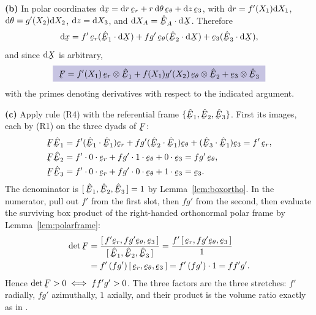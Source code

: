 \begin{solution}
\textbf{(b)} In polar coordinates $\dl\bx=\dl r\,\ber+r\,\dl\theta\,\bet
+\dl z\,\be_{3}$, with $\mathrm{d} r=f'(X_{1})\mathrm{d} X_{1}$,
$\mathrm{d}\theta=g'(X_{2})\mathrm{d} X_{2}$, $\mathrm{d} z=\mathrm{d} X_{3}$, and
$\dl X_{A}=\ip{\hbE_{A}}{\dl\bX}$. Therefore
\[
   \dl\bx=f'\,\ber(\ip{\hbE_{1}}{\dl\bX})
         +f g'\,\bet(\ip{\hbE_{2}}{\dl\bX})
         +\be_{3}(\ip{\hbE_{3}}{\dl\bX}),
\]
and since $\dl\bX$ is arbitrary,
\[
   \boxed{\ \bF=f'(X_{1})\,\ber\otimes\hbE_{1}
      +f(X_{1})g'(X_{2})\,\bet\otimes\hbE_{2}
      +\be_{3}\otimes\hbE_{3}\ }
\]
with the primes denoting derivatives with respect to the indicated
argument.

\textbf{(c)} Apply rule (R4) with the referential frame
$\{\hbE_{1},\hbE_{2},\hbE_{3}\}$. First its images, each by (R1) on the
three dyads of $\bF$:
\[
\begin{aligned}
   \bF\hbE_{1}&=f'(\ip{\hbE_{1}}{\hbE_{1}})\ber
     +fg'(\ip{\hbE_{2}}{\hbE_{1}})\bet+(\ip{\hbE_{3}}{\hbE_{1}})\be_{3}
     =f'\,\ber,\\
   \bF\hbE_{2}&=f'\cdot0\cdot\ber+fg'\cdot1\cdot\bet+0\cdot\be_{3}
     =fg'\,\bet,\\
   \bF\hbE_{3}&=f'\cdot0\cdot\ber+fg'\cdot0\cdot\bet+1\cdot\be_{3}
     =\be_{3}.
\end{aligned}
\]
The denominator is $\tbox{\hbE_{1}}{\hbE_{2}}{\hbE_{3}}=1$ by
Lemma~\ref{lem:boxortho}. In the numerator, pull out $f'$ from the first
slot, then $fg'$ from the second, then evaluate the surviving box product
of the right-handed orthonormal polar frame by
Lemma~\ref{lem:polarframe}:
\[
\begin{aligned}
   \det\bF&=\frac{\tbox{f'\ber}{fg'\bet}{\be_{3}}}
                 {\tbox{\hbE_{1}}{\hbE_{2}}{\hbE_{3}}}
    =\frac{f'\,\tbox{\ber}{fg'\bet}{\be_{3}}}{1}\\
   &=f'\,(fg')\,\tbox{\ber}{\bet}{\be_{3}}
    =f'\,(fg')\cdot1=ff'g' .
\end{aligned}
\]
Hence $\det\bF>0\iff ff'g'>0$. The three factors are the three stretches:
$f'$ radially, $fg'$ azimuthally, $1$ axially, and their product is the
volume ratio exactly as in .


\end{solution}
